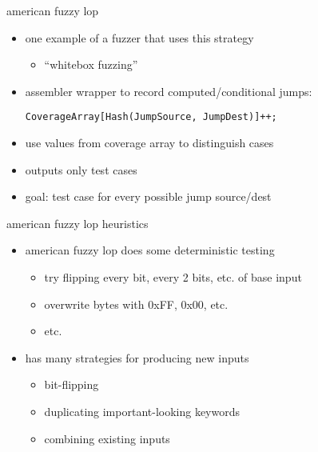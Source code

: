
\begin{frame}[fragile,label=afl]{american fuzzy lop}
    \begin{itemize}
        \item one example of a fuzzer that uses this strategy
            \begin{itemize}
            \item ``whitebox fuzzing''
            \end{itemize}
        \vspace{.5cm}
        \item assembler wrapper to record computed/conditional jumps:
\begin{lstlisting}
CoverageArray[Hash(JumpSource, JumpDest)]++;
\end{lstlisting}
        \item use values from coverage array to distinguish cases
        \item outputs only  test cases
        \item goal: test case for every possible jump source/dest
    \end{itemize}
\end{frame}

\begin{frame}{american fuzzy lop heuristics}
    \begin{itemize}
    \item american fuzzy lop does some deterministic testing
        \begin{itemize}
        \item try flipping every bit, every 2 bits, etc. of base input
        \item overwrite bytes with 0xFF, 0x00, etc.
        \item etc.
        \end{itemize}
    \item has many strategies for producing new inputs
        \begin{itemize}
        \item bit-flipping
        \item duplicating important-looking keywords
        \item combining existing inputs
        \end{itemize}
    \end{itemize}
\end{frame}

